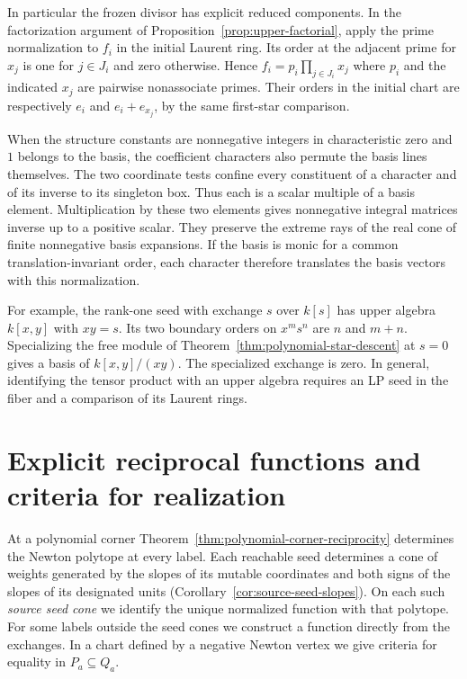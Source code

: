 \documentclass[11pt,reqno]{amsart}
\numberwithin{equation}{section}
\theoremstyle{definition}
\theoremstyle{remark}
\begin{document}
In particular the frozen divisor has explicit reduced components.
In the factorization argument of Proposition~\ref{prop:upper-factorial},
apply the prime normalization to \(f_i\) in the initial Laurent ring.
Its order at the adjacent prime for \(x_j\) is one for \(j\in J_i\)
and zero otherwise. Hence
\(f_i=p_i\prod_{j\in J_i}x_j\)
where \(p_i\) and the indicated \(x_j\) are pairwise nonassociate primes.
Their orders in the initial chart are respectively \(e_i\) and
\(e_i+e_{x_j}\), by the same first-star comparison.

When the structure constants are nonnegative integers in characteristic
zero and \(1\) belongs to the basis, the coefficient characters also
permute the basis lines themselves. The two coordinate tests confine
every constituent of a character and of its inverse to its singleton
box. Thus each is a scalar multiple of a basis element. Multiplication
by these two elements gives nonnegative integral matrices inverse up to
a positive scalar. They preserve the extreme rays of the real cone of
finite nonnegative basis expansions. If the basis is monic for a common
translation-invariant order, each character therefore translates the
basis vectors with this normalization.

For example, the rank-one seed with exchange \(s\) over \(k[s]\) has
upper algebra \(k[x,y]\) with \(xy=s\). Its two boundary orders on
\(x^m s^n\) are \(n\) and \(m+n\). Specializing the free module of
Theorem~\ref{thm:polynomial-star-descent} at \(s=0\) gives a basis
of \(k[x,y]/(xy)\). The specialized exchange is zero. In general,
identifying the tensor product with an upper algebra requires an LP
seed in the fiber and a comparison of its Laurent rings.

\section{Explicit reciprocal functions and criteria for realization}\label{sec:explicit-reciprocal-functions}

At a polynomial corner Theorem~\ref{thm:polynomial-corner-reciprocity}
determines the Newton polytope at every label. Each reachable seed
determines a cone of weights generated by the slopes of its mutable
coordinates and both signs of the slopes of its designated units
(Corollary~\ref{cor:source-seed-slopes}). On each such \emph{source
seed cone} we identify the unique normalized function with that polytope. For
some labels outside the seed cones we construct a function directly
from the exchanges. In a chart defined by a negative Newton vertex
we give criteria for equality in \(P_a\subseteq Q_a\).
\end{document}
